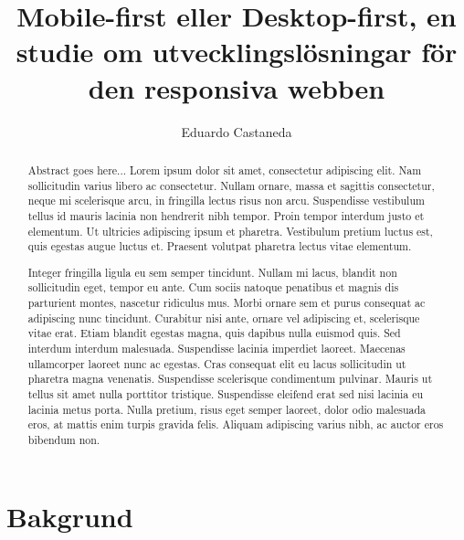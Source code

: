 \documentclass[11pt]{article}
\title{Mobile-first eller Desktop-first, en studie om utvecklingslösningar för den responsiva webben}
\author{Eduardo Castaneda}
\begin{document}
\maketitle
\thispagestyle{empty}


\newpage

\begin{abstract}
Abstract goes here... Lorem ipsum dolor sit amet, consectetur adipiscing elit. Nam sollicitudin varius libero ac consectetur. Nullam ornare, massa et sagittis consectetur, neque mi scelerisque arcu, in fringilla lectus risus non arcu. Suspendisse vestibulum tellus id mauris lacinia non hendrerit nibh tempor. Proin tempor interdum justo et elementum. Ut ultricies adipiscing ipsum et pharetra. Vestibulum pretium luctus est, quis egestas augue luctus et. Praesent volutpat pharetra lectus vitae elementum.

Integer fringilla ligula eu sem semper tincidunt. Nullam mi lacus, blandit non sollicitudin eget, tempor eu ante. Cum sociis natoque penatibus et magnis dis parturient montes, nascetur ridiculus mus. Morbi ornare sem et purus consequat ac adipiscing nunc tincidunt. Curabitur nisi ante, ornare vel adipiscing et, scelerisque vitae erat. Etiam blandit egestas magna, quis dapibus nulla euismod quis. Sed interdum interdum malesuada. Suspendisse lacinia imperdiet laoreet. Maecenas ullamcorper laoreet nunc ac egestas. Cras consequat elit eu lacus sollicitudin ut pharetra magna venenatis. Suspendisse scelerisque condimentum pulvinar. Mauris ut tellus sit amet nulla porttitor tristique. Suspendisse eleifend erat sed nisi lacinia eu lacinia metus porta. Nulla pretium, risus eget semper laoreet, dolor odio malesuada eros, at mattis enim turpis gravida felis. Aliquam adipiscing varius nibh, ac auctor eros bibendum non.
\end{abstract}
\thispagestyle{empty}

\newpage
\tableofcontents

\newpage
\section{Bakgrund}
\end{document}
